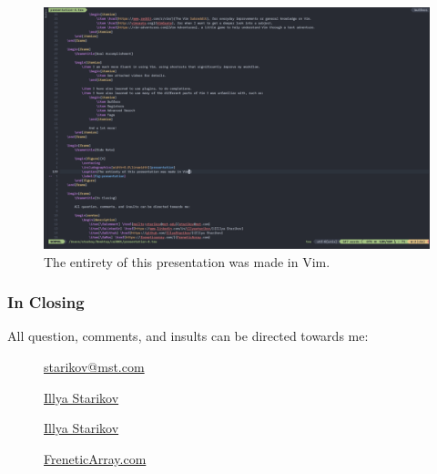 \documentclass[xclolor=dvipsnames]{beamer}            %
\begin{document}
\begin{darkframes}
\begin{frame}
        \begin{figure}[H]
            \centering
            \includegraphics[width=0.95\linewidth]{assets/presentation.png}
            \caption{The entirety of this presentation was made in Vim.}
            \label{fig:presentation}
        \end{figure}
    \end{frame}

    \begin{frame}
        \frametitle{In Closing}

        All question, comments, and insults can be directed towards me:

        \begin{center}
            \begin{description}
                \item[\faComment] \href{mailto:starikov@mst.edu}{starikov@mst.com}
                \item[\faLinkedin] \href{https://www.linkedin.com/in/illyastarikov/}{Illya Starikov}
                \item[\faGithub] \href{https://github.com/IllyaStarikov/}{Illya Starikov}
                \item[\faRss] \href{https://freneticarray.com/}{FreneticArray.com}
            \end{description}
        \end{center}
    \end{frame}
\end{darkframes}
\end{document}

